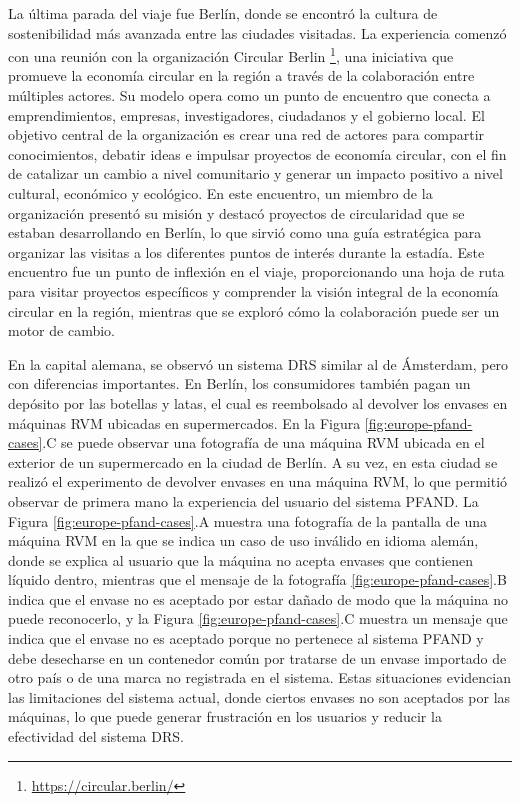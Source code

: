 La última parada del viaje fue Berlín, donde se encontró la cultura de sostenibilidad más avanzada entre las ciudades visitadas. La experiencia comenzó con una reunión con la organización Circular Berlin \footnote{\url{https://circular.berlin/}}, una iniciativa que promueve la economía circular en la región a través de la colaboración entre múltiples actores. Su modelo opera como un punto de encuentro que conecta a emprendimientos, empresas, investigadores, ciudadanos y el gobierno local. El objetivo central de la organización es crear una red de actores para compartir conocimientos, debatir ideas e impulsar proyectos de economía circular, con el fin de catalizar un cambio a nivel comunitario y generar un impacto positivo a nivel cultural, económico y ecológico. En este encuentro, un miembro de la organización presentó su misión y destacó proyectos de circularidad que se estaban desarrollando en Berlín, lo que sirvió como una guía estratégica para organizar las visitas a los diferentes puntos de interés durante la estadía. Este encuentro fue un punto de inflexión en el viaje, proporcionando una hoja de ruta para visitar proyectos específicos y comprender la visión integral de la economía circular en la región, mientras que se exploró cómo la colaboración puede ser un motor de cambio.

En la capital alemana, se observó un sistema DRS similar al de Ámsterdam, pero con diferencias importantes. En Berlín, los consumidores también pagan un depósito por las botellas y latas, el cual es reembolsado al devolver los envases en máquinas RVM ubicadas en supermercados. En la Figura \ref{fig:europe-pfand-cases}.C se puede observar una fotografía de una máquina RVM ubicada en el exterior de un supermercado en la ciudad de Berlín. A su vez, en esta ciudad se realizó el experimento de devolver envases en una máquina RVM, lo que permitió observar de primera mano la experiencia del usuario del sistema PFAND. La Figura \ref{fig:europe-pfand-cases}.A muestra una fotografía de la pantalla de una máquina RVM en la que se indica un caso de uso inválido en idioma alemán, donde se explica al usuario que la máquina no acepta envases que contienen líquido dentro, mientras que el mensaje de la fotografía \ref{fig:europe-pfand-cases}.B indica que el envase no es aceptado por estar dañado de modo que la máquina no puede reconocerlo, y la Figura \ref{fig:europe-pfand-cases}.C muestra un mensaje que indica que el envase no es aceptado porque no pertenece al sistema PFAND y debe desecharse en un contenedor común por tratarse de un envase importado de otro país o de una marca no registrada en el sistema. Estas situaciones evidencian las limitaciones del sistema actual, donde ciertos envases no son aceptados por las máquinas, lo que puede generar frustración en los usuarios y reducir la efectividad del sistema DRS. 

